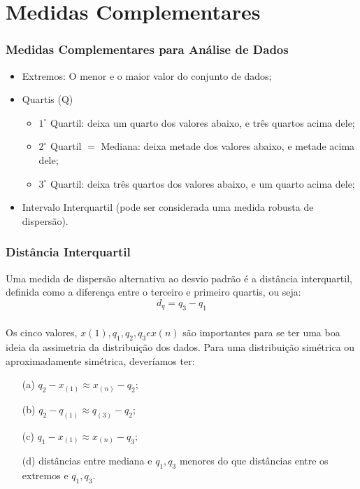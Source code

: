 \documentclass[14pt,aspectratio=1610]{beamer}
\begin{document}
\section{Medidas Complementares}
\begin{frame}{}
\frametitle{Medidas Complementares para Análise de Dados}
\begin{block}{}
\justifying
\begin{itemize}
\item Extremos: O menor e o maior valor do conjunto de dados;
\item Quartis (Q)
\begin{itemize}
\item $1^{\circ}$ Quartil: deixa um quarto dos valores abaixo, e três quartos acima dele;
\item $2^{\circ}$ Quartil $=$ Mediana: deixa metade dos valores abaixo, e metade acima dele;
\item $3^{\circ}$ Quartil: deixa três quartos dos valores abaixo, e um quarto acima dele;
\end{itemize}
\item Intervalo Interquartil (pode ser considerada uma medida robusta de dispersão).
\end{itemize}
\end{block}
\end{frame}

\begin{frame}{}
\frametitle{Distância Interquartil}
\begin{block}{}
\justifying
Uma medida de dispersão alternativa ao desvio padrão é a distância interquartil, definida como a diferença entre o terceiro e primeiro quartis, ou seja:
$$d_{q}=q_{3}-q_{1}$$
\end{block}
\end{frame}

\begin{frame}{}
\frametitle{}
\begin{block}{}
\justifying
Os cinco valores, $x(1), q_{1}, q_{2}, q_{3} e x(n)$ são importantes para se ter uma boa ideia da assimetria da distribuição dos dados. Para uma distribuição simétrica 
ou aproximadamente simétrica, deveríamos ter:
\begin{enumerate}
\item[(a)] $q_{2}-x_{(1)}\approx x_{(n)}-q_{2};$
\item[(b)] $q_{2}-q_{(1)}\approx q_{(3)}-q_{2};$
\item[(c)] $q_{1}-x_{(1)}\approx x_{(n)}-q_{3};$
\item[(d)] distâncias entre mediana e $q_{1}, q_{3}$ menores do que distâncias entre os extremos e $q_{1}, q_{3}.$
\end{enumerate}
\end{block}
\end{frame}
\end{document}
